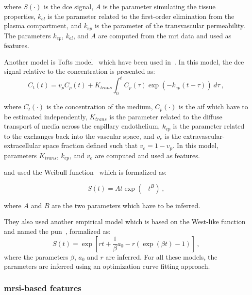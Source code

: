 \noindent where $S(\cdot)$ is the \ac{dce} signal, $A$ is the parameter simulating the tissue properties, $k_{el}$ is the parameter related to the first-order elimination from the plasma compartment, and $k_{ep}$ is the parameter of the transvascular permeability.
The parameters $k_{ep}$, $k_{el}$, and $A$ are computed from the \ac{mri} data and used as features.

Another model is Tofts model~\cite{Tofts1997} which have been used in~\cite{Langer2009,Giannini2013,Niaf2011,Niaf2012,Mazzetti2011,lehaire2014computer,giannini2015fully}.
In this model, the \ac{dce} signal relative to the concentration is presented as:
\begin{equation}
	C_t(t) = v_p C_p(t) + K_{trans} \int_{0}^{t} C_p(\tau) \exp( -k_{ep}(t-\tau) ) \ d\tau \ ,
	\label{eq:tofts} 
\end{equation}

\noindent where $C_t(\cdot)$ is the concentration of the medium, $C_p(\cdot)$ is the \ac{aif} which have to be estimated independently, $K_{trans}$ is the parameter related to the diffuse transport of media across the capillary endothelium, $k_{ep}$ is the parameter related to the exchanges back into the vascular space, and $v_e$ is the extravascular-extracellular space fraction defined such that $v_e = 1 - v_p$.
In this model, parameters $K_{trans}$, $k_{ep}$, and $v_e$ are computed and used as features.

\citeauthor{Mazzetti2011} and \citeauthor{giannini2015fully} used the Weibull function~\cite{Mazzetti2011,Giannini2013,giannini2015fully} which is formalized as:

\begin{equation}
	S(t) = A t \exp( -t^{B} ) \ ,
	\label{eq:weibull}
\end{equation}

\noindent where $A$ and $B$ are the two parameters which have to be inferred.

They also used another empirical model which is based on the West-like function and named the \ac{pun}~\cite{Castorina2006}, formalized as:
\begin{equation}
	S(t) = \exp \left[ r t + \frac{1}{\beta} a_0 - r \left( \exp( \beta t ) - 1 \right) \right] \ ,
	\label{eq:pun}
\end{equation}
\noindent where the parameters $\beta$, $a_0$ and $r$ are inferred.
For all these models, the parameters are inferred using an optimization curve fitting approach.

\subsubsection{\acs*{mrsi}-based features}\label{subsubsec:chp3:img-clas:CADX-fea-dec:MRSI-fea}

